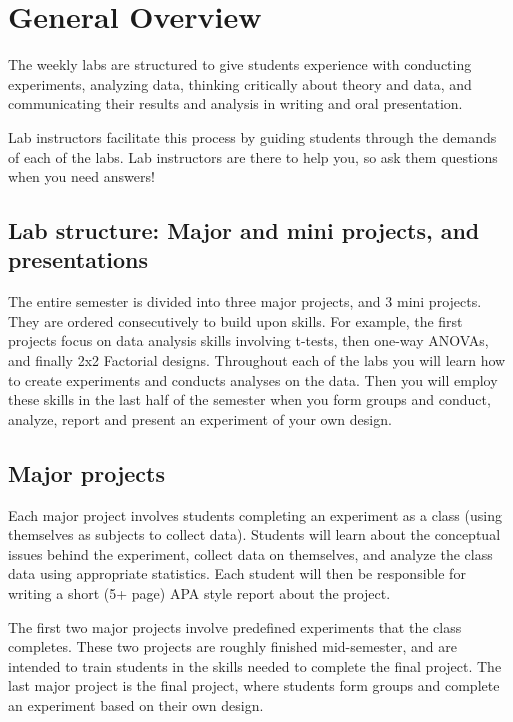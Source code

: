 

\section{General Overview}

The weekly labs are structured to give students experience with conducting experiments, analyzing data, thinking critically about theory and data, and communicating their results and analysis in writing and oral presentation. 

Lab instructors facilitate this process by guiding students through the demands of each of the labs. Lab instructors are there to help you, so ask them questions when you need answers!

\subsection{Lab structure: Major and mini projects, and presentations}

The entire semester is divided into three major projects, and 3 mini projects. They are ordered consecutively to build upon skills. For example, the first projects focus on data analysis skills involving t-tests, then one-way ANOVAs, and finally 2x2 Factorial designs. Throughout each of the labs you will learn how to create experiments and conducts analyses on the data. Then you will employ these skills in the last half of the semester when you form groups and conduct, analyze, report and present an experiment of your own design.


\subsection{Major projects}  

Each major project involves students completing an experiment as a class (using themselves as subjects to collect data). Students will learn about the conceptual issues behind the experiment, collect data on themselves, and analyze the class data using appropriate statistics. Each student will then be responsible for writing a short (5+ page) APA style report about the project. 

The first two major projects involve predefined experiments that the class completes. These two projects are roughly finished mid-semester, and are intended to train students in the skills needed to complete the final project. The last major project is the final project, where students form groups and complete an experiment based on their own design. 

